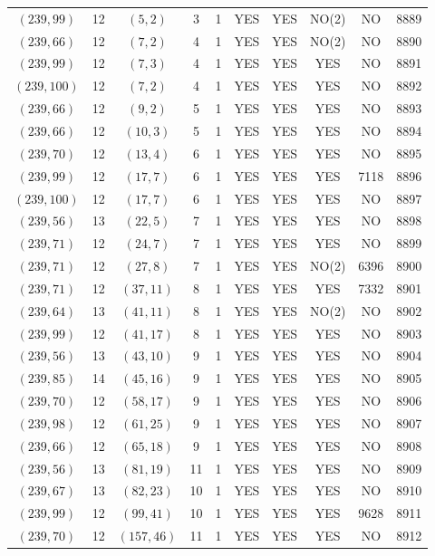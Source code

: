 \begin{longtable}{|c|c|c|c|c|c|c|c|c|c|}
$(239, 99)$ & 12 & $(5, 2)$ & 3 & 1 & YES & YES & NO(2) & NO & 8889\\
$(239, 66)$ & 12 & $(7, 2)$ & 4 & 1 & YES & YES & NO(2) & NO & 8890\\
$(239, 99)$ & 12 & $(7, 3)$ & 4 & 1 & YES & YES & YES & NO & 8891\\
$(239, 100)$ & 12 & $(7, 2)$ & 4 & 1 & YES & YES & YES & NO & 8892\\
$(239, 66)$ & 12 & $(9, 2)$ & 5 & 1 & YES & YES & YES & NO & 8893\\
$(239, 66)$ & 12 & $(10, 3)$ & 5 & 1 & YES & YES & YES & NO & 8894\\
$(239, 70)$ & 12 & $(13, 4)$ & 6 & 1 & YES & YES & YES & NO & 8895\\
$(239, 99)$ & 12 & $(17, 7)$ & 6 & 1 & YES & YES & YES & 7118 & 8896\\
$(239, 100)$ & 12 & $(17, 7)$ & 6 & 1 & YES & YES & YES & NO & 8897\\
$(239, 56)$ & 13 & $(22, 5)$ & 7 & 1 & YES & YES & YES & NO & 8898\\
$(239, 71)$ & 12 & $(24, 7)$ & 7 & 1 & YES & YES & YES & NO & 8899\\
$(239, 71)$ & 12 & $(27, 8)$ & 7 & 1 & YES & YES & NO(2) & 6396 & 8900\\
$(239, 71)$ & 12 & $(37, 11)$ & 8 & 1 & YES & YES & YES & 7332 & 8901\\
$(239, 64)$ & 13 & $(41, 11)$ & 8 & 1 & YES & YES & NO(2) & NO & 8902\\
$(239, 99)$ & 12 & $(41, 17)$ & 8 & 1 & YES & YES & YES & NO & 8903\\
$(239, 56)$ & 13 & $(43, 10)$ & 9 & 1 & YES & YES & YES & NO & 8904\\
$(239, 85)$ & 14 & $(45, 16)$ & 9 & 1 & YES & YES & YES & NO & 8905\\
$(239, 70)$ & 12 & $(58, 17)$ & 9 & 1 & YES & YES & YES & NO & 8906\\
$(239, 98)$ & 12 & $(61, 25)$ & 9 & 1 & YES & YES & YES & NO & 8907\\
$(239, 66)$ & 12 & $(65, 18)$ & 9 & 1 & YES & YES & YES & NO & 8908\\
$(239, 56)$ & 13 & $(81, 19)$ & 11 & 1 & YES & YES & YES & NO & 8909\\
$(239, 67)$ & 13 & $(82, 23)$ & 10 & 1 & YES & YES & YES & NO & 8910\\
$(239, 99)$ & 12 & $(99, 41)$ & 10 & 1 & YES & YES & YES & 9628 & 8911\\
$(239, 70)$ & 12 & $(157, 46)$ & 11 & 1 & YES & YES & YES & NO & 8912\\

\end{longtable}

